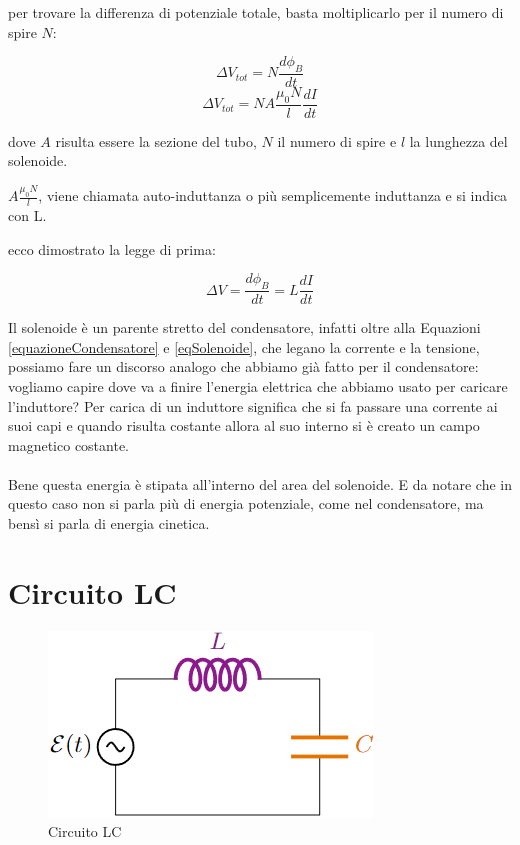 per trovare la differenza di potenziale totale, basta moltiplicarlo per il numero di spire $N$:

\begin{equation*}
    \Delta V_{tot} = N \frac{d \phi_B}{dt}
\end{equation*}
\begin{equation*}
    \Delta V_{tot} = N A \frac{\mu_0 N}{l} \frac{d I}{dt} 
\end{equation*}

dove $A$ risulta essere la sezione del tubo, $N$ il numero di spire e $l$ la lunghezza del solenoide.


$A \frac{\mu_0 N}{l}$, viene chiamata auto-induttanza o più semplicemente induttanza e si indica con L.

ecco dimostrato la legge di prima:

\begin{equation}
    \Delta V = \frac{d \phi_B}{dt} = L \frac{d I}{dt} 
    \label{eqSolenoide}
\end{equation}


Il solenoide è un parente stretto del condensatore, infatti oltre alla Equazioni \ref{equazioneCondensatore} e \ref{eqSolenoide}, che legano la corrente e la tensione, possiamo fare un discorso analogo che abbiamo già fatto per il condensatore: vogliamo capire dove va a finire l'energia elettrica che abbiamo usato per caricare l'induttore? Per carica di un induttore significa che si fa passare una corrente ai suoi capi e quando risulta costante allora al suo interno si è creato un campo magnetico costante.

\paragraph{}
Bene questa energia è stipata all'interno del area del solenoide. E da notare che in questo caso non si parla più di energia potenziale, come nel condensatore, ma bensì si parla di energia cinetica. 

\section{Circuito LC}

\begin{figure}[H]
    \centering
    \includegraphics[scale = 0.6]{image/circuito_LC.png}
    \caption{Circuito LC}
    \label{ciruitoLc}
\end{figure}

